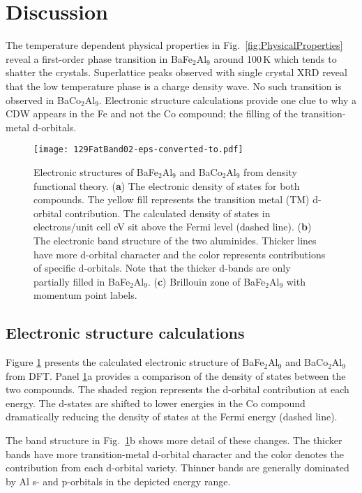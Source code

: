 \documentclass[journal=cmatex,manuscript=article]{achemso}
\begin{document}
\section{Discussion}

The temperature dependent physical properties in Fig.~\ref{fig:PhysicalProperties} reveal a first-order phase transition in BaFe$_2$Al$_9$ around 100\,K which tends to shatter the crystals. Superlattice peaks observed with single crystal XRD reveal that the low temperature phase is a charge density wave. No such transition is observed in BaCo$_2$Al$_9$. Electronic structure calculations provide one clue to why a CDW appears in the Fe and not the Co compound; the filling of the transition-metal d-orbitals.

\begin{figure}
	\texttt{[image: 129FatBand02-eps-converted-to.pdf]}
	\caption{\label{fig:DFT} 
		Electronic structures of BaFe$_2$Al$_9$ and BaCo$_2$Al$_9$ from density functional theory. (\textbf{a}) The electronic density of states for both compounds. The yellow fill represents the transition metal (TM) d-orbital contribution. The calculated density of states in electrons/unit cell eV sit above the Fermi level (dashed line). (\textbf{b}) The electronic band structure of the two aluminides. Thicker lines have more d-orbital character and the color represents contributions of specific d-orbitals. Note that the thicker d-bands are only partially filled in BaFe$_2$Al$_9$. (\textbf{c}) Brillouin zone of BaFe$_2$Al$_9$ with momentum point labels.
	}
\end{figure}

\subsection{Electronic structure calculations}
\label{sec:Discussion_ElectronicStructure}

Figure \ref{fig:DFT} presents the calculated electronic structure of BaFe$_2$Al$_9$ and BaCo$_2$Al$_9$ from DFT. Panel \ref{fig:DFT}a provides a comparison of the density of states between the two compounds. The shaded region represents the d-orbital contribution at each energy. The d-states are shifted to lower energies in the Co compound dramatically reducing the density of states at the Fermi energy (dashed line). 
	
The band structure in Fig.~\ref{fig:DFT}b shows more detail of these changes.
The thicker bands have more transition-metal d-orbital character and the color denotes the contribution from each d-orbital variety. Thinner bands are generally dominated by Al s- and p-orbitals in the depicted energy range.
\end{document}
